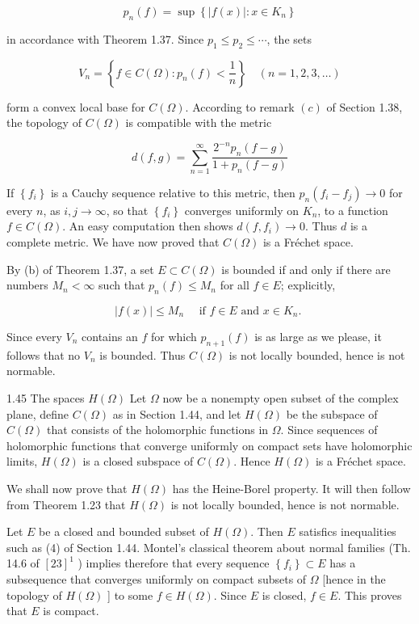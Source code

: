 \documentclass[10pt]{article}
\begin{document}
$$
p_{n}(f)=\sup \left\{|f(x)|: x \in K_{n}\right\}
$$

in accordance with Theorem 1.37. Since $p_{1} \leq p_{2} \leq \cdots$, the sets

$$
V_{n}=\left\{f \in C(\Omega): p_{n}(f)<\frac{1}{n}\right\} \quad(n=1,2,3, \ldots)
$$

form a convex local base for $C(\Omega)$. According to remark $(c)$ of Section 1.38, the topology of $C(\Omega)$ is compatible with the metric

$$
d(f, g)=\sum_{n=1}^{\infty} \frac{2^{-n} p_{n}(f-g)}{1+p_{n}(f-g)}
$$

If $\left\{f_{i}\right\}$ is a Cauchy sequence relative to this metric, then $p_{n}\left(f_{i}-f_{j}\right) \rightarrow 0$ for every $n$, as $i, j \rightarrow \infty$, so that $\left\{f_{i}\right\}$ converges uniformly on $K_{n}$, to a function $f \in C(\Omega)$. An easy computation then shows $d\left(f, f_{i}\right) \rightarrow 0$. Thus $d$ is a complete metric. We have now proved that $C(\Omega)$ is a Fréchet space.

By (b) of Theorem 1.37, a set $E \subset C(\Omega)$ is bounded if and only if there are numbers $M_{n}<\infty$ such that $p_{n}(f) \leq M_{n}$ for all $f \in E$; explicitly,

$$
|f(x)| \leq M_{n} \quad \text { if } f \in E \text { and } x \in K_{n} \text {. }
$$

Since every $V_{n}$ contains an $f$ for which $p_{n+1}(f)$ is as large as we please, it follows that no $V_{n}$ is bounded. Thus $C(\Omega)$ is not locally bounded, hence is not normable.

1.45 The spaces $H(\Omega)$ Let $\Omega$ now be a nonempty open subset of the complex plane, define $C(\Omega)$ as in Section 1.44, and let $H(\Omega)$ be the subspace of $C(\Omega)$ that consists of the holomorphic functions in $\Omega$. Since sequences of holomorphic functions that converge uniformly on compact sets have holomorphic limits, $H(\Omega)$ is a closed subspace of $C(\Omega)$. Hence $H(\Omega)$ is a Fréchet space.

We shall now prove that $H(\Omega)$ has the Heine-Borel property. It will then follow from Theorem 1.23 that $H(\Omega)$ is not locally bounded, hence is not normable.

Let $E$ be a closed and bounded subset of $H(\Omega)$. Then $E$ satisfics inequalities such as (4) of Section 1.44. Montel's classical theorem about normal families (Th. 14.6 of $[23]^{1}$ ) implies therefore that every sequence $\left\{f_{i}\right\} \subset E$ has a subsequence that converges uniformly on compact subsets of $\Omega$ [hence in the topology of $H(\Omega)$ ] to some $f \in H(\Omega)$. Since $E$ is closed, $f \in E$. This proves that $E$ is compact.
\end{document}
